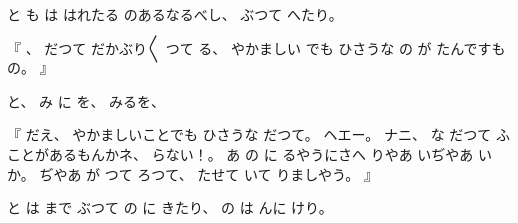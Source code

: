 %
と
も
は
はれたる
のあるなるべし、
%
ぶつて
へたり。

%
『
、
%
だつて
だかぶり〳〵
つて
る、
%
やかましい
でも
ひさうな
の
が
たんですもの。
』

%
と、
%
み
に
を、%
%
みるを、

%
『
だえ、
%
やかましいことでも
ひさうな
だつて。
%
ヘエー。
%
ナニ、
%
な
だつて
ふことがあるもんかネ、
%
らない！。
%
あ
の
に
るやうにさへ
りやあ
いぢやあ
いか。
%
ぢやあ
が
つて
ろつて、
%
たせて
いて
りましやう。
』

%
と
は
まで
ぶつて
の
に
きたり、
%
の
は
んに
けり。

